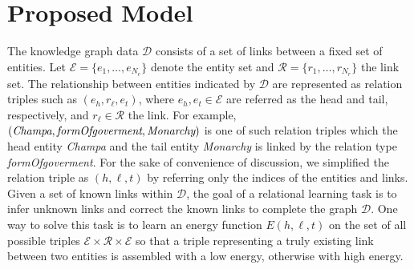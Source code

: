 \documentclass[10pt,journal]{IEEEtran}
\begin{document}
\section{Proposed Model} \label{math}
The knowledge graph data $\mathcal{D}$ consists of a set of links between a fixed set of entities. Let $\mathcal{E} = \{e_1, \ldots, e_{N_e}\}$ denote the entity set and $\mathcal{R} = \{r_1, \ldots, r_{N_r}\}$ the link set.  The relationship between entities indicated by $\mathcal{D}$ are represented as relation triples such as $(e_h,r_{\ell},e_t)$, where $e_h, e_t\in \mathcal{E}$ are referred as the head  and tail, respectively, and  $r_{\ell} \in \mathcal{R}$ the link.  For example, $(\emph{Champa}, \emph{formOfgoverment}, \emph{Monarchy})$ is one of such relation triples which the head entity \emph{Champa} and the tail entity \emph{Monarchy} is linked by the relation type \emph{formOfgoverment}.  For the sake of convenience of discussion, we simplified the relation triple as $(h,\ell, t)$   by referring only the indices of the entities and links. Given a set of known links within $\mathcal{D}$, the goal of a relational learning task is to  infer unknown links and correct the known links to complete the graph $\mathcal{D}$. One way to solve this task is to learn an energy function $E(h, \ell, t)$ on the set of all possible triples $\mathcal{E} \times \mathcal{R} \times \mathcal{E}$ so that a triple representing a truly existing link between two entities  is assembled with a low energy, otherwise with high energy. 

\end{document}
